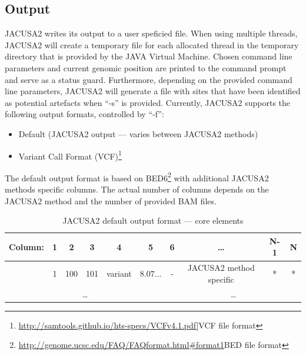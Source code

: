 \documentclass[10pt,a4paper]{article}
\begin{document}
\subsection{Output}
JACUSA2 writes its output to a user speficied file. When using multiple threads, JACUSA2 will
create a temporary file for each allocated thread in the temporary directory that is provided by the 
JAVA Virtual Machine. Chosen command line parameters and current genomic position are printed to the 
command prompt and serve as a status guard. Furthermore, depending on the provided command line 
parameters, JACUSA2 will generate a file with sites that have been identified as potential artefacts 
when ``-s'' is provided. Currently, JACUSA2 supports the following output formats, controlled by ``-f'':
\begin{itemize}
  \item Default (JACUSA2 output --- varies between JACUSA2 methods)
  \item Variant Call Format (VCF)\footnote{\url{http://samtools.github.io/hts-specs/VCFv4.1.pdf]}{VCF file format}}
\end{itemize}
The default output format is based on
BED6\footnote{\url{http://genome.ucsc.edu/FAQ/FAQformat.html\#format1}{BED file format}} with
additional JACUSA2 methods specific columns. The actual number of columns depends on the JACUSA2 
method and the number of provided BAM files.
\begin{table}[ht]
\caption{JACUSA2 default output format --- core elements}
{\small
\begin{tabular}{lcccccc|ccc}
Column: & 1 & 2 & 3 & 4 & 5 & 6 & \ldots & N-1 & N \\
\hline
& 1 & 100 & 101 & variant & $8.07\ldots$ & - & JACUSA2 method specific & * & * \\	
\multicolumn{6}{c|}{\ldots} & \multicolumn{4}{c}{\ldots}
\end{tabular}}
\end{table}
\end{document}
